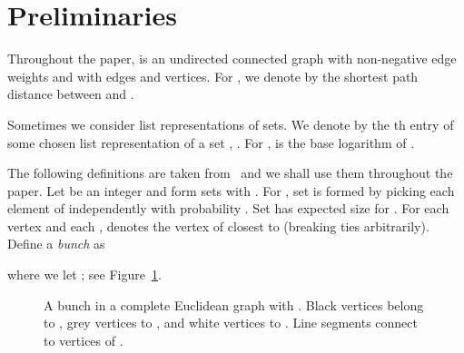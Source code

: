 \documentclass[11pt]{article}
\begin{document}
\section{Preliminaries}\label{sec:Prelim}
Throughout the paper,  is an undirected connected graph with non-negative edge weights and with  edges and 
vertices. For , we denote by  the shortest path distance between  and .

Sometimes we consider list representations of sets. We denote by  the th entry of some chosen
list representation of a set , . For ,  is the base  logarithm of .

The following definitions are taken from~\cite{ThorupZwick} and we shall use them throughout the paper.
Let  be an integer and form sets  with
. For , set  is formed by
picking each element of  independently with probability . Set  has expected size  for
. For each vertex  and each ,
 denotes the vertex of  closest to  (breaking ties arbitrarily). Define a \emph{bunch}  as

where we let ; see Figure~\ref{fig:Bunch}.
\begin{figure}\centerline{}
\caption{A bunch  in a complete Euclidean graph with . Black vertices belong to
, grey vertices to , and white vertices to . Line segments connect  to
vertices of .}
\label{fig:Bunch}
\end{figure}
\end{document}
